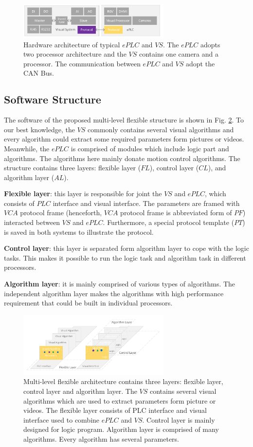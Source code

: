 \documentclass[journal,UTF8]{IEEEtran}
\begin{document}
\begin{figure}
	\centering
	\includegraphics[width=3in]{fig/Hardware.pdf}
	\caption{Hardware architecture of typical $ePLC$ and $VS$. The $ePLC$ adopts two processor architecture and the $VS$ contains one camera and a processor. The communication between $ePLC$ and $VS$ adopt the CAN Bus.}
	\label{fig:Hardware}
\end{figure}
\subsection{Software Structure}
The software of the proposed multi-level flexible structure is shown in Fig. \ref{fig:Software}. To our best knowledge, the $VS$ commonly contains several visual algorithms and every algorithm could extract some required parameters form pictures or videos. Meanwhile, the $ePLC$ is comprised of modules which include logic part and algorithms. The algorithms here mainly donate motion control algorithms. The structure contains three layers: flexible layer ($FL$), control layer ($CL$), and algorithm layer ($AL$).

\textbf{Flexible layer}: this layer is responsible for joint the $VS$ and $ePLC$, which consists of $PLC$ interface and visual interface. The parameters are framed with $VCA$ protocol frame (henceforth, $VCA$ protocol frame is abbreviated form of $PF$) interacted between $VS$ and $ePLC$. Furthermore, a special protocol template ($PT$) is saved in both systems to illustrate the protocol.

\textbf{Control layer}: this layer is separated form algorithm layer to cope with the logic tasks. This makes it possible to run the logic task and algorithm task in different processors.

\textbf{Algorithm layer}: it is mainly comprised of various types of algorithms. The independent algorithm layer makes the algorithms with high performance requirement that could be built in individual processors. 


\begin{figure}
	\centering
	\includegraphics[width=3in]{fig/Software.pdf}
	\caption{Multi-level flexible architecture contains three layers: flexible layer, control layer and algorithm layer. The $VS$ contains several visual algorithms which are used to extract parameters form picture or videos. The flexible layer consists of PLC interface and visual interface used to combine $ePLC$ and $VS$. Control layer is mainly designed for logic program. Algorithm layer is comprised of many algorithms. Every algorithm has several parameters.}
	\label{fig:Software}
\end{figure}
\end{document}
